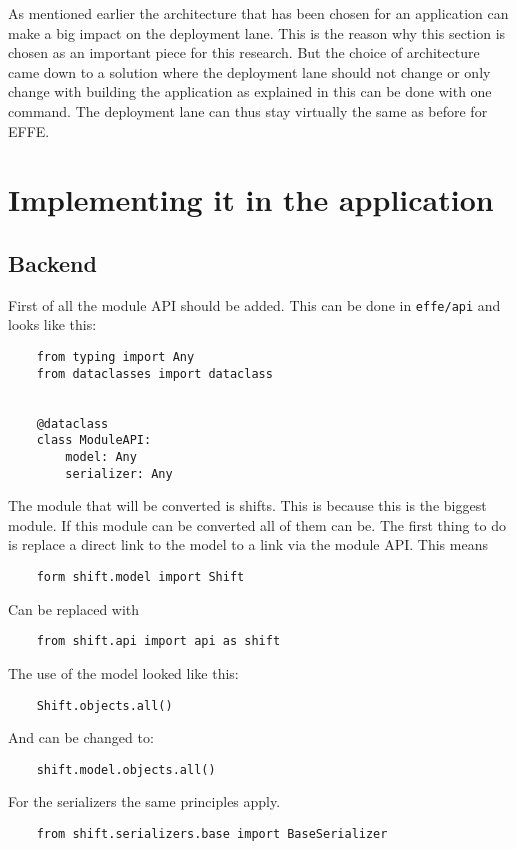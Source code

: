 As mentioned earlier the architecture that has been chosen for an application can make a big impact on the deployment lane. This is the reason why this section is chosen as an important piece for this research. But the choice of architecture came down to a solution where the deployment lane should not change or only change with building the application as explained in  this can be done with one command. The deployment lane can thus stay virtually the same as before for EFFE.

\section{Implementing it in the application}

\subsection{Backend}

First of all the module API should be added. This can be done in \texttt{effe/api} and looks like this:
\begin{verbatim}
    from typing import Any
    from dataclasses import dataclass


    @dataclass
    class ModuleAPI:
        model: Any
        serializer: Any
\end{verbatim}

The module that will be converted is shifts. This is because this is the biggest module. If this module can be converted all of them can be. The first thing to do is replace a direct link to the model to a link via the module API. This means
\begin{verbatim}
    form shift.model import Shift
\end{verbatim}

Can be replaced with
\begin{verbatim}
    from shift.api import api as shift
\end{verbatim}

The use of the model looked like this:
\begin{verbatim}
    Shift.objects.all()
\end{verbatim}

And can be changed to:
\begin{verbatim}
    shift.model.objects.all()
\end{verbatim}

For the serializers the same principles apply.
\begin{verbatim}
    from shift.serializers.base import BaseSerializer
\end{verbatim}

